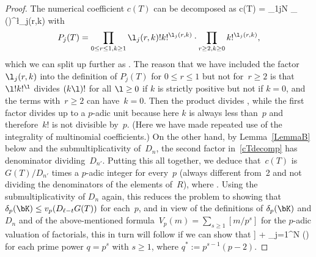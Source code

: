 \begin{proof}
The numerical coefficient $c(T)$ can be decomposed as
\be
\label{cTdecomp}
c(T) = \prod_{1\le j\le N} \cdot
\prod_{}
 \biggl(\biggr)^{\l_j(r,k)}
\ee
with
\[
P_j(T) = \prod_{0\le r\le1, k\ge1}\l_j(r,k)! k!^{\l_j(r,k)} \cdot
\prod_{r\ge2, k\ge0}k!^{\l_j(r,k)} ,
\]
which we can split up further as .
The reason that we have included the factor $\l_j(r,k)$ into the definition of
$P_j(T)$ for $0\le r\le1$ but not for~$r\ge2$ is that~$\l!k!^\l$ divides $(k\l)!$
for all $\l\ge0$ if $k$ is strictly positive but not if $k=0$, and the terms with~${r\ge2}$ can have~$k=0$. Then the product 
divides , while the first factor  divides 
up to a $p$-adic unit because here $k$ is always less than~$p$ and therefore~$k!$
is not divisible by~$p$. (Here we have made repeated use of the integrality of
multinomial coefficients.) On the other hand, by Lemma~\ref{LemmaB} below
and the submultiplicativity of~$D_n$, the second factor in~\eqref{cTdecomp} has
denominator dividing~$D_{n'}$. Putting this all together, we deduce that~$c(T)$
is $G(T)/D_{n'}$ times a $p$-adic integer for every~$p$ (always different from~2
and not dividing the denominators of the elements of~$R$), where
. Using the
submultiplicativity of $D_n$ again, this reduces the problem to showing that
${\delta_p(\bK)\le v_p(D_{\ell-t} G(T))}$ for each~$p$, and in view of
the definitions of $\delta_p(\bK)$ and $D_n$ and of the above-mentioned formula~${V_p(m)=\sum_{s\ge1}[m/p^s]}$ for the $p$-adic valuation of factorials, this in turn
will follow if we can show that
\be
\label{Final}
\Biggl[\frac12\sum_{j=1}^N\biggl[\frac{K_j}q\biggr]\Biggr] \le
{}
+ \sum_{j=1}^N \Bigg( \m {}
\m {} \Bigg)
\ee
for each prime power $q=p^s$ with $s\ge1$, where $q^*:=p^{s-1}(p-2)$. %


\end{proof}
